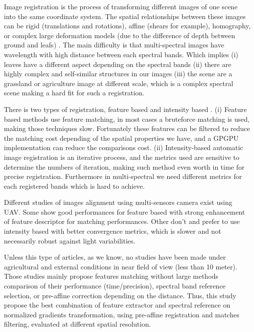 \documentclass[]{elsarticle}
\begin{document}
	Image registration is the process of transforming different images of one scene into the same coordinate system.
	The spatial relationships between these images can be rigid (translations and rotations), affine (shears for example),
	homography, or complex large deformation models (due to the difference of depth between ground and leafs) \cite{Kamoun}.
	The main difficulty is that multi-spectral images have wavelength with high distance between each spectral bands.
	Which implies (i) leaves have a different aspect depending on the spectral bands
	(ii) there are highly complex and self-similar structures in our images
	(iii) the scene are a grassland or agriculture image at different scale, which is a complex spectral scene making a hard fit for such a registration.
	\\
	\par There is two types of registration, feature based and intensity based \cite{Zitova}.
	(i) Feature based methods use feature matching, in most cases a bruteforce matching is used, making those techniques slow.
	Fortunately these features can be filtered to reduce the matching cost depending of the spatial properties we have, and a GPGPU implementation can reduce the comparisons cost.
	(ii) Intensity-based automatic image registration is an iterative process, and the metrics used are sensitive to determine the numbers of iteration,
	making such method even worth in time for precise registration. Furthermore in multi-spectral we need different metrics for each registered bands which is hard to achieve.
	\\
	\par Different studies of images alignment using multi-sensors camera exist using UAV.
	Some show good performances for feature based \cite{DantasDiasJunior, Vakalopoulou} with strong enhancement of feature descriptor for matching performances.
	Other don't and prefer to use intensity based \cite{douarre:hal-02183837} with better convergence metrics, which is slower and not necessarily robust against light variabilities.
	\\
	\par Unless this type of articles, as we know, no studies have been made under agricultural and external conditions in near field of view (less than 10 meter).
	Those studies mainly propose features matching without large methods comparison of their performance (time/precision),
	spectral band reference selection, or pre-affine correction depending on the distance.
	Thus, this study propose the best combination of feature extractor and spectral reference on normalized gradients transformation,
	using pre-affine registration and matches filtering, evaluated at different spatial resolution.
	
\end{document}
